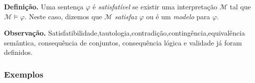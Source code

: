         \textbf{Definição.} Uma sentença $\varphi$ é \textit{satisfatível} se existir uma interpretação $\mathcal{M}$ tal que 
        $\mathcal{M} \models \varphi$. Neste caso, dizemos que $\mathcal{M}$ \textit{satisfaz} $\varphi$ ou é um \textit{modelo} para $\varphi$.

        \textbf{Observação.} Satisfatibilidade,tautologia,contradição,contingência,equivalência semântica,
        consequência de conjuntos, consequência lógica e validade já foram definidos.

        \subsubsection*{Exemplos}
        